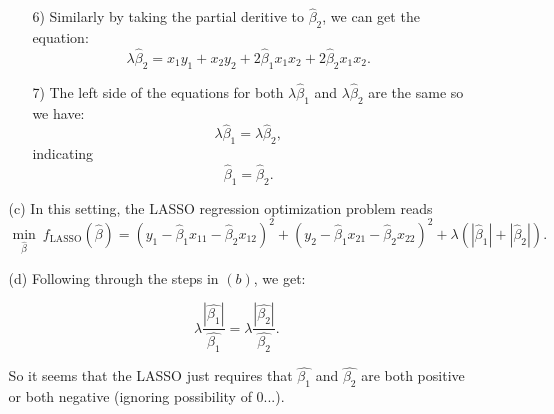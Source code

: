 \documentclass[10pt]{article}
\begin{document}
\begin{enumerate}[1.]
\begin{itemize}
\begin{itemize}
    			\item[6)] Similarly by taking the partial deritive to $\hat{\beta}_2$, we can get the equation:
    			$$\lambda\hat{\beta}_2 = x_1y_1 + x_2y_2 + 2\hat{\beta}_1x_1x_2 + 2\hat{\beta}_2x_1x_2.$$
    			
    			\item[7)] The left side of the equations for both $\lambda\hat{\beta}_1$ and $\lambda\hat{\beta}_2$ are the same so we have:
    			$$\lambda\hat{\beta}_1 = \lambda\hat{\beta}_2,$$
    			indicating
    			$$\hat{\beta}_1 = \hat{\beta}_2.$$
    		\end{itemize}
    	
    	\item[(c)] In this setting, the LASSO regression optimization problem reads
    	\begin{equation*}
    		\min_{\hat{\beta}}~ f_{\textrm{LASSO}}(\hat{\beta}) = (y_1 - \hat{\beta}_1x_{11} - \hat{\beta}_2x_{12})^2 + (y_2 - \hat{\beta}_1x_{21} - \hat{\beta}_2x_{22})^2 + \lambda (|\hat{\beta}_1| + |\hat{\beta}_2|).
    	\end{equation*}
    	
    	\item[(d)] Following through the steps in $(b)$, we get:
    	
    	$$\lambda\frac{|\hat{\beta_1}|}{\hat{\beta_1}} = \lambda\frac{|\hat{\beta_2}|}{\hat{\beta_2}}.$$
    	
		So it seems that the LASSO just requires that $\hat{\beta_1}$ and $\hat{\beta_2}$ are both positive or both negative (ignoring possibility of 0...).
		




\end{itemize}
\end{enumerate}
\end{document}
